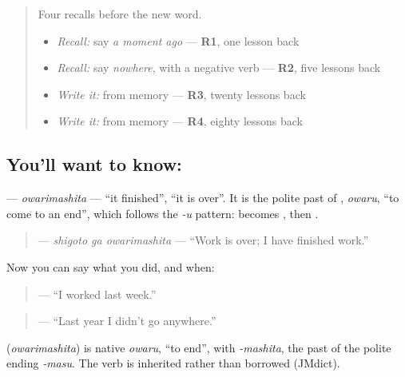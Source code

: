 \begin{quote}
Four recalls before the new word.

\begin{itemize}
\raggedright
  \item \emph{Recall:} say \emph{a moment ago} — \textbf{R1}, one lesson back
  \item \emph{Recall:} say \emph{nowhere}, with a negative verb — \textbf{R2}, five lessons back
  \item \emph{Write it:} \textbf{} from memory — \textbf{R3}, twenty lessons back
  \item \emph{Write it:} \textbf{} from memory — \textbf{R4}, eighty lessons back
\end{itemize}
\end{quote}

\subsection*{You'll want to know: }
\textbf{} — \emph{owarimashita} — \textquotedblleft{}it finished\textquotedblright{}, \textquotedblleft{}it is over\textquotedblright{}. It is the polite past of \textbf{}, \emph{owaru}, \textquotedblleft{}to come to an end\textquotedblright{}, which follows the \emph{-u} pattern: \textbf{} becomes \textbf{}, then \textbf{}.

\begin{quote}
\textbf{ } — \emph{shigoto ga owarimashita} — \textquotedblleft{}Work is over; I have finished work.\textquotedblright{}
\end{quote}

Now you can say what you did, and when:

\begin{quote}
\textbf{ } — \textquotedblleft{}I worked last week.\textquotedblright{}
\end{quote}

\begin{quote}
\textbf{  } — \textquotedblleft{}Last year I didn't go anywhere.\textquotedblright{}
\end{quote}

\begin{cousinweb}
\textbf{} (\emph{owarimashita}) is native \emph{owaru}, \textquotedblleft{}to end\textquotedblright{}, with \emph{-mashita}, the past of the polite ending \emph{-masu}. The verb is inherited rather than borrowed (JMdict).
\end{cousinweb}

